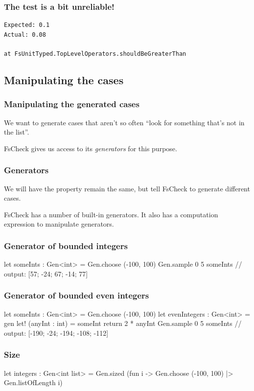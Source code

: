 \documentclass{beamer}
\begin{document}
\begin{frame}[fragile]
\frametitle{The test is a bit unreliable!}
\begin{verbatim}
Expected: 0.1
Actual: 0.08

at FsUnitTyped.TopLevelOperators.shouldBeGreaterThan
\end{verbatim}
\end{frame}

\subsection{Manipulating the cases}
\begin{frame}
\frametitle{Manipulating the generated cases}
We want to generate cases that aren't so often ``look for something that's not in the list''.

FsCheck gives us access to its \emph{generators} for this purpose.
\end{frame}

\begin{frame}[fragile]
\frametitle{Generators}
We will have the property remain the same, but tell FsCheck to generate different cases.

FsCheck has a number of built-in generators.
It also has a computation expression to manipulate generators.
\end{frame}

\begin{frame}[fragile]
\frametitle{Generator of bounded integers}

\begin{fslisting}
let someInts : Gen<int> = Gen.choose (-100, 100)
Gen.sample 0 5 someInts
// output: [57; -24; 67; -14; 77]
\end{fslisting}
\end{frame}

\begin{frame}[fragile]
\frametitle{Generator of bounded even integers}
\begin{fslisting}
let someInts : Gen<int> = Gen.choose (-100, 100)
let evenIntegers : Gen<int> = gen {
    let! (anyInt : int) = someInt
    return 2 * anyInt
}
Gen.sample 0 5 someInts
// output: [-190; -24; -194; -108; -112]
\end{fslisting}
\end{frame}

\begin{frame}[fragile]
\frametitle{Size}
\begin{fslisting}
let integers : Gen<int list> =
    Gen.sized (fun i ->
        Gen.choose (-100, 100)
        |> Gen.listOfLength i)
\end{fslisting}
\end{frame}
\end{document}
